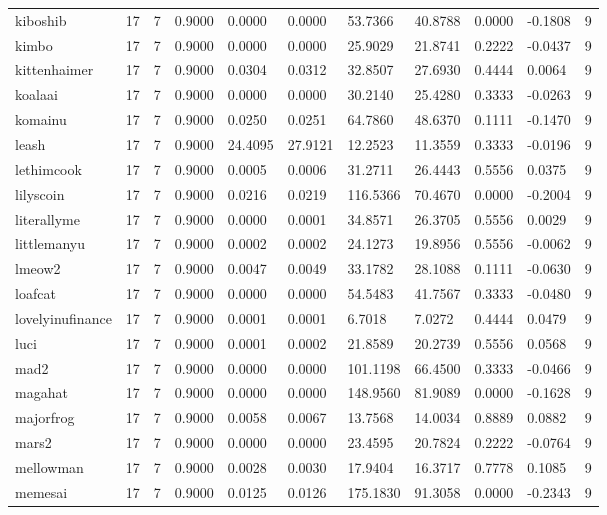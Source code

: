 \begin{table}[htbp]
\begin{tabular}{lllllllllll}
kiboshib & 17 & 7 & 0.9000 & 0.0000 & 0.0000 & 53.7366 & 40.8788 & 0.0000 & -0.1808 & 9 \\
kimbo & 17 & 7 & 0.9000 & 0.0000 & 0.0000 & 25.9029 & 21.8741 & 0.2222 & -0.0437 & 9 \\
kittenhaimer & 17 & 7 & 0.9000 & 0.0304 & 0.0312 & 32.8507 & 27.6930 & 0.4444 & 0.0064 & 9 \\
koalaai & 17 & 7 & 0.9000 & 0.0000 & 0.0000 & 30.2140 & 25.4280 & 0.3333 & -0.0263 & 9 \\
komainu & 17 & 7 & 0.9000 & 0.0250 & 0.0251 & 64.7860 & 48.6370 & 0.1111 & -0.1470 & 9 \\
leash & 17 & 7 & 0.9000 & 24.4095 & 27.9121 & 12.2523 & 11.3559 & 0.3333 & -0.0196 & 9 \\
lethimcook & 17 & 7 & 0.9000 & 0.0005 & 0.0006 & 31.2711 & 26.4443 & 0.5556 & 0.0375 & 9 \\
lilyscoin & 17 & 7 & 0.9000 & 0.0216 & 0.0219 & 116.5366 & 70.4670 & 0.0000 & -0.2004 & 9 \\
literallyme & 17 & 7 & 0.9000 & 0.0000 & 0.0001 & 34.8571 & 26.3705 & 0.5556 & 0.0029 & 9 \\
littlemanyu & 17 & 7 & 0.9000 & 0.0002 & 0.0002 & 24.1273 & 19.8956 & 0.5556 & -0.0062 & 9 \\
lmeow2 & 17 & 7 & 0.9000 & 0.0047 & 0.0049 & 33.1782 & 28.1088 & 0.1111 & -0.0630 & 9 \\
loafcat & 17 & 7 & 0.9000 & 0.0000 & 0.0000 & 54.5483 & 41.7567 & 0.3333 & -0.0480 & 9 \\
lovelyinufinance & 17 & 7 & 0.9000 & 0.0001 & 0.0001 & 6.7018 & 7.0272 & 0.4444 & 0.0479 & 9 \\
luci & 17 & 7 & 0.9000 & 0.0001 & 0.0002 & 21.8589 & 20.2739 & 0.5556 & 0.0568 & 9 \\
mad2 & 17 & 7 & 0.9000 & 0.0000 & 0.0000 & 101.1198 & 66.4500 & 0.3333 & -0.0466 & 9 \\
magahat & 17 & 7 & 0.9000 & 0.0000 & 0.0000 & 148.9560 & 81.9089 & 0.0000 & -0.1628 & 9 \\
majorfrog & 17 & 7 & 0.9000 & 0.0058 & 0.0067 & 13.7568 & 14.0034 & 0.8889 & 0.0882 & 9 \\
mars2 & 17 & 7 & 0.9000 & 0.0000 & 0.0000 & 23.4595 & 20.7824 & 0.2222 & -0.0764 & 9 \\
mellowman & 17 & 7 & 0.9000 & 0.0028 & 0.0030 & 17.9404 & 16.3717 & 0.7778 & 0.1085 & 9 \\
memesai & 17 & 7 & 0.9000 & 0.0125 & 0.0126 & 175.1830 & 91.3058 & 0.0000 & -0.2343 & 9 \\

\end{tabular}
\end{table}
